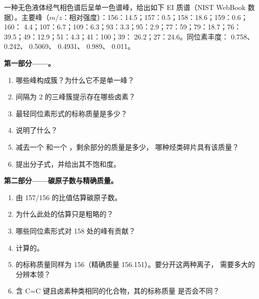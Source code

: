 \begin{problem}
\label{pb:b2:mass-spec-atomic:1}
一种无色液体经气相色谱后呈单一色谱峰，给出如下 EI 质谱（NIST
WebBook 数据）。主要峰（$m/z$：相对强度）：156：14.5；157：0.5；158：18.6；159：0.6；160：
4.4；107：6.7；109：6.3；93：3.3；95：2.9；77：59；79：18.7；76：39.5；49：12.9；51：4.3；41：100；39：
26.2；27：24.6。同位素丰度： 0.758、 0.242、 0.5069、
 0.4931、 0.989、 0.011。

\begin{center}
\end{center}

\medskip
\noindent\textbf{第一部分——。}
\begin{enumerate}
  \item 哪些峰构成簇？为什么它不是单一峰？
  \item 间隔为 2 的三峰簇提示存在哪些卤素？
  \item 最轻同位素形式的标称质量是多少？
  \item {}说明了什么？
  \item 减去一个  和一个 ，剩余部分的质量是多少，
        哪种烃类碎片具有该质量？
  \item 提出分子式，并给出其不饱和度。
\end{enumerate}

\medskip
\noindent\textbf{第二部分——碳原子数与精确质量。}
\begin{enumerate}[resume]
  \item 由 157/156 的比值估算碳原子数。
  \item 为什么此处的估算只是粗略的？
  \item 哪些同位素形式对 158 处的峰有贡献？
  \item 计算的。
  \item {} 的标称质量同样为 156（精确质量 156.151）。要分开这两种离子，
        需要多大的分辨本领？
  \item 含 C=C 键且卤素种类相同的化合物，其的标称质量
        是否会不同？
\end{enumerate}


\end{problem}
